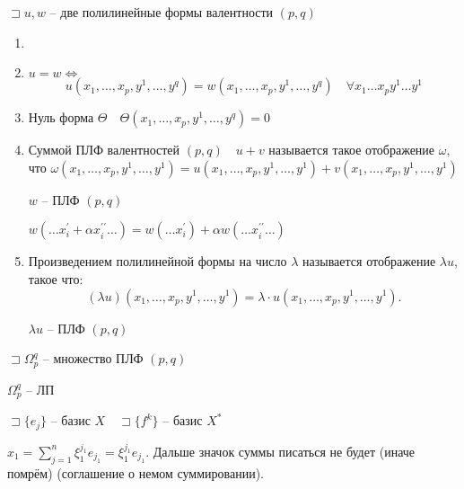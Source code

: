 \documentclass{book}
\newcommand{\p}[1]{#1^{\prime}}
\newcommand{\pp}[1]{#1^{\prime\prime}}
\theoremstyle{definition}
\begin{document}
    $\sqsupset u, w$ -- две полилинейные формы валентности $(p,q)$
     \begin{definition}
        \begin{enumerate}
            \item []
            \item $u=w \iff $ \[u(x_1, \ldots, x_p, y^1, \ldots, y^q) = w(x_1, \ldots, x_p, y^1, \ldots, y^q) \quad\forall x_1\ldots x_p y^1 \ldots y^1\] 
            \item Нуль форма $\Theta\quad \Theta\left( x_1, \ldots, x_p, y^1, \ldots, y^q \right)  = 0$
            \item Суммой ПЛФ валентностей $(p,q)\quad u+v$ называется такое отображение  $\omega$, что  $\omega(x_1, \ldots, x_p, y^1, \ldots, y^1) = u\left( x_1, \ldots, x_p, y^1, \ldots, y^1 \right) + v\left( x_1, \ldots, x_p, y^1, \ldots, y^1 \right)  $
                \begin{lemma}
                    $w$ -- ПЛФ  $(p,q)$

                    $w\left( \ldots \p x_i+\alpha \pp x_i \ldots \right)  = w\left( \ldots \p x_i \right) +\alpha w\left( \ldots \pp x_i \ldots \right) $
                \end{lemma}
            \item Произведением полилинейной формы на число $\lambda$ называется отображение  $\lambda u$, такое что:  \[
                    (\lambda u)\left( x_1, \ldots, x_p, y^1, \ldots, y^1 \right)  = \lambda \cdot u\left( x_1, \ldots, x_p, y^1, \ldots, y^1 \right) 
            .\] 
                    \begin{lemma}
                        $\lambda u$ -- ПЛФ  $(p,q)$
                    \end{lemma}


        \end{enumerate}
    \end{definition}

    $\sqsupset \Omega_p^q$ -- множество ПЛФ $(p,q)$

     \begin{statement}
        $\Omega_p^q$ -- ЛП
    \end{statement}


    $\sqsupset \{e_j\}$ -- базис $X\quad \sqsupset \{f^k\}$ -- базис $X^*$

    $x_1 = \sum_{j=1}^{n} \xi_1^{j_1} e_{j_1} = \xi_1^{j_1}e_{j_1}$. Дальше значок суммы писаться не будет (иначе помрём) (соглашение о немом суммировании).
\end{document}
